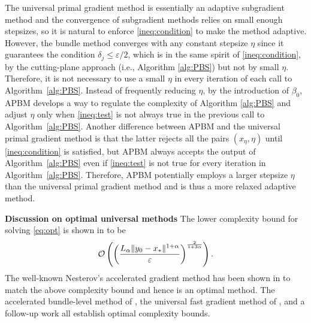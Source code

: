 \documentclass[11pt,letterpaper]{article}
\newcommand{\vgap}{\vspace{.1in}}
\newcommand{\lam}{{\lambda}}
\begin{document}

The universal primal gradient method is essentially an adaptive subgradient method and the convergence of subgradient methods relies on small enough stepsizes, so it is natural to enforce \eqref{ineq:condition} to make the method adaptive.
However, the bundle method converges with any constant stepsize $\eta$ since it guarantees the condition $\delta_j\le \varepsilon/2$, which is in the same spirit of \eqref{ineq:condition}, by the cutting-plane approach (i.e., Algorithm \ref{alg:PBS}) but not by small $\eta$. Therefore, it is not necessary to use a small $\eta$ in every iteration of each call to Algorithm~\ref{alg:PBS}. Instead of frequently reducing $\eta$, by the introduction of $\beta_0$, APBM develops a way to regulate the complexity of Algorithm \ref{alg:PBS} and adjust $\eta$ only when \eqref{ineq:test} is not always true in the previous call to Algorithm~\ref{alg:PBS}.
Another difference between APBM and the universal primal gradient method is that the latter rejects all the pairs $(x_\eta,\eta)$ until \eqref{ineq:condition} is satisfied, but APBM always accepts the output of Algorithm~\ref{alg:PBS} even if \eqref{ineq:test} is not true for every iteration in Algorithm~\ref{alg:PBS}.
Therefore, APBM potentially employs a larger stepsize $\eta$ than the universal primal gradient method and is thus a more relaxed adaptive method.



\vgap

{\bf Discussion on optimal universal methods}
The lower complexity bound for solving \eqref{eq:opt} is shown in \cite{nemirovsky1983problem} to be
\[
{\cal O}\left(\left(\frac{L_\alpha \|y_0-x_*\|^{1+\alpha}}{\varepsilon}\right)^{\frac{2}{1+3\alpha}}\right). 
\]
The well-known Nesterov's accelerated gradient method has been shown in \cite{nemirovskii1985optimal} to match the above complexity bound and hence is an optimal method.
The accelerated bundle-level method of \cite{lan2015bundle}, the universal fast gradient method of \cite{nesterov2015universal}, and a follow-up work \cite{grimmer2024optimal} all establish optimal complexity bounds.
\end{document}
